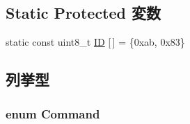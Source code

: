 \subsection*{Static Protected 変数}
\begin{DoxyCompactItemize}
\item 
static const uint8\_\-t \hyperlink{classX86ISA_1_1PS2Keyboard_aad1dea7ff5c01171f72700e686ae867e}{ID} \mbox{[}$\,$\mbox{]} = \{0xab, 0x83\}
\end{DoxyCompactItemize}


\subsection{列挙型}
\hypertarget{classX86ISA_1_1PS2Keyboard_a2afce0a47a93eee73a314d53e4890153}{
\subsubsection[{Command}]{\setlength{\rightskip}{0pt plus 5cm}enum {\bf Command}}}
\label{classX86ISA_1_1PS2Keyboard_a2afce0a47a93eee73a314d53e4890153}
